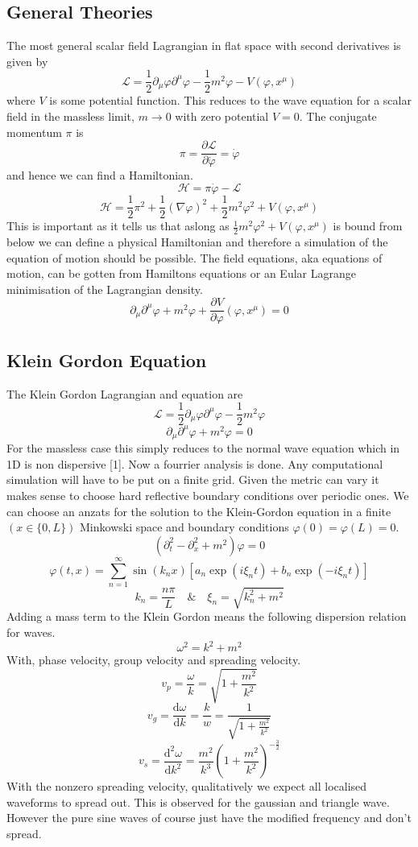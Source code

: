 \documentclass[11pt, oneside]{report}  %
\newcommand{\dd}{\mathrm{d}}
\numberwithin{equation}{section}
\begin{document}
\subsection{General Theories}
The most general scalar field Lagrangian in flat space with second derivatives is given by
$$\mathcal{L} = \frac{1}{2}\partial_\mu\varphi \partial^\mu \varphi - \frac{1}{2}m^2 \varphi-V(\varphi,x^\mu) $$
where $V$ is some potential function. This reduces to the wave equation for a scalar field in the massless limit, $m \rightarrow 0$ with zero potential $V=0$. The conjugate momentum $\pi$ is 
$$ \pi = \frac{\partial \mathcal{L}}{\partial \dot\varphi} = \dot\varphi$$
and hence we can find a Hamiltonian.
$$ \mathcal{H} = \pi\dot{\varphi} - \mathcal{L}$$
$$ \boxed{\mathcal{H} = \frac{1}{2}\pi^2 +\frac{1}{2}(\nabla\varphi)^2 + \frac{1}{2}m^2\varphi^2 + V(\varphi,x^\mu)}$$
This is important as it tells us that aslong as $\frac{1}{2}m^2\varphi^2 + V(\varphi,x^\mu)$ is bound from below we can define a physical Hamiltonian and therefore a simulation of the equation of motion should be possible. The field equations, aka equations of motion, can be gotten from Hamiltons equations or an Eular Lagrange minimisation of the Lagrangian density. 
$$ \boxed{\partial_\mu\partial^\mu\varphi + m^2\varphi + \frac{\partial V}{\partial \varphi}(\varphi,x^\mu)=0}$$

\subsection{Klein Gordon Equation}
The Klein Gordon Lagrangian and equation are 
$$\mathcal{L} = \frac{1}{2}\partial_\mu\varphi \partial^\mu \varphi - \frac{1}{2}m^2 \varphi $$
$$\partial_\mu\partial^\mu\varphi + m^2\varphi =0$$
For the massless case this simply reduces to the normal wave equation which in 1D is non dispersive [1].  Now a fourrier analysis is done. Any computational simulation will have to be put on a finite grid. Given the metric can vary it makes sense to choose hard reflective boundary conditions over periodic ones. We can choose an anzats for the solution to the Klein-Gordon equation in a finite $(x \in \{0,L \})$ Minkowski space and boundary conditions $\varphi(0) = \varphi(L) =0$.
$$ (\partial_t^2 - \partial_x^2 + m^2)\varphi = 0 $$
$$ \varphi(t,x) = \sum^\infty_{n=1} \sin(k_n x) \left[ a_n\exp(i\xi_n t) + b_n \exp(-i\xi_n t) \right]$$ 
$$ k_n = \frac{n\pi}{L} \quad \& \quad \xi_n = \sqrt{k_n^2 + m^2}$$
Adding a mass term to the Klein Gordon means the following dispersion relation for waves.
$$ \omega^2 = k^2 + m^2$$
With, phase velocity, group velocity and spreading velocity.
$$ v_p = \frac{\omega}{k} = \sqrt{1+\frac{m^2}{k^2}}$$
$$ v_g = \frac{\dd \omega}{\dd k} = \frac{k}{w} =\frac{1}{\sqrt{1+\frac{m^2}{k^2}}} $$
$$ v_s = \frac{\dd^2 \omega}{\dd k^2} = \frac{m^2}{k^3}\left({1+\frac{m^2}{k^2}}\right)^{-\frac{3}{2}}$$
With the nonzero spreading velocity, qualitatively we expect all localised waveforms to spread out. This is observed for the gaussian and triangle wave. However the pure sine waves of course just have the modified frequency and don't spread. 
\end{document}
